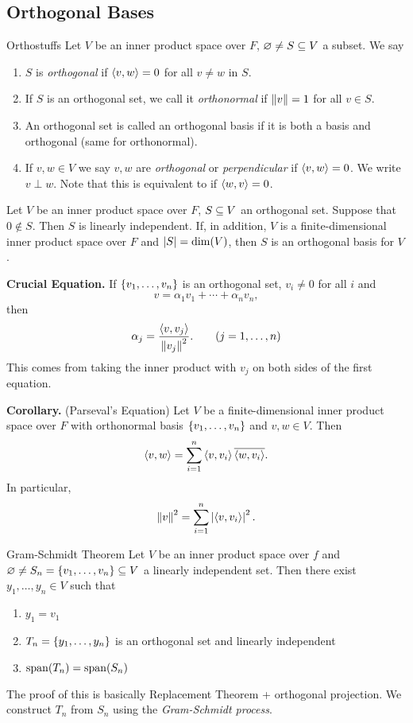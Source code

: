 \documentclass[class=article, crop=false]{standalone}
\begin{document}
  \subsection{Orthogonal Bases}
  \begin{definition}{Orthostuffs}
    Let $V$ be an inner product space over $F$, $\varnothing\neq S\subseteq V$ a subset. We say
    \begin{enumerate}[label=(\alph*)]
      \item $S$ is \emph{orthogonal} if $\left\langle v, w \right\rangle = 0$ for all $v\neq w$ in $S$.
      \item If $S$ is an orthogonal set, we call it \emph{orthonormal} if $\left\lVert v\right\rVert = 1$ for all $v\in S$.
      \item An orthogonal set is called an orthogonal basis if it is both a basis and orthogonal (same for orthonormal).
      \item If $v, w\in V$ we say $v, w$ are \emph{orthogonal} or \emph{perpendicular} if $\left\langle v, w \right\rangle = 0$. We write $v\perp w$. Note that this is equivalent to if $\left\langle w, v \right\rangle = 0$.
    \end{enumerate}
  \end{definition}
  \begin{theorem}{}
    Let $V$ be an inner product space over $F$, $S\subseteq V$ an orthogonal set. Suppose that $0\notin S$. Then $S$ is linearly independent. If, in addition, $V$ is a finite-dimensional inner product space over $F$ and $\left\lvert S \right\rvert = \dim(V)$, then $S$ is an orthogonal basis for $V$.
  \end{theorem}
  \textbf{Crucial Equation.} If $\left\{v_1, \dotsc,v_n\right\}$ is an orthogonal set, $v_i\neq 0$ for all $i$ and
  \[
    v = \alpha_1v_1 + \dotsb + \alpha_nv_n, \tag{$\alpha_1, \dotsc,\alpha_n\in F$}
  \]
  then 
  \[
    \alpha_j = \frac{\left\langle v, v_j \right\rangle}{\left\lVert v_j\right\rVert^2}. \tag{$j = 1,\dotsc,n$}
  \]
  This comes from taking the inner product with $v_j$ on both sides of the first equation.\par
  \textbf{Corollary.} (Parseval's Equation) Let $V$ be a finite-dimensional inner product space over $F$ with orthonormal basis $\left\{v_1, \dotsc,v_n\right\}$ and $v, w\in V$. Then
  \[
    \left\langle  v, w \right\rangle = \sum_{i=1}^{n}\left\langle v, v_i \right\rangle\overline{\left\langle w, v_i \right\rangle}.
  \]
  In particular, 
  \[
    \left\lVert v\right\rVert^2 = \sum_{i=1}^{n}\left\lvert \left\langle v,v_i \right\rangle \right\rvert^2.
  \]
  \begin{theorem}{Gram-Schmidt Theorem}
    Let $V$ be an inner product space over $f$ and $\varnothing\neq S_n = \left\{v_1,\dotsc,v_n\right\}\subseteq V$ a linearly independent set. Then there exist $y_1,\dotsc,y_n\in V$ such that
    \begin{enumerate}[label=(\alph*)]
      \item $y_1 = v_1$
      \item $T_n = \left\{y_1,\dotsc,y_n\right\}$ is an orthogonal set and linearly independent
      \item $\operatorname{span}(T_n) = \operatorname{span}(S_n)$
    \end{enumerate}
    The proof of this is basically Replacement Theorem + orthogonal projection. We construct $T_n$ from $S_n$ using the \emph{Gram-Schmidt process}.
  \end{theorem}
\end{document}
